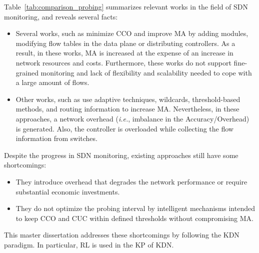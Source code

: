 Table~\ref{tab:comparison_probing} summarizes relevant works in the field of SDN monitoring, and reveals several facts:
\begin{itemize}
    \item Several works, such as \cite{su_2014:flowcover, Sun_2015:HONE,phan2017:sdn_mon,liao_2018:LLDP-looping,jose_2011:online_measurement,tangari_2017:decentralized_monitoring,Tangari_2018:adaptive_decentralized_monitoring,phan2017:adaptive_sdn_mon,tahaei_2018:cost_effective} minimize CCO and improve MA by adding modules, modifying flow tables in the data plane or distributing controllers. As a result, in these works, MA is increased at the expense of an increase in network resources and costs. Furthermore, these works do not support fine-grained monitoring and lack of flexibility and scalability needed to cope with a large amount of flows.
    
    \item Other works, such as \cite{chowdhury_2014:payless,raumer_2014:monsamp,van_2014:OpenNetMon, tahaei_2017:multi-objective,Tootoonchian_2010:opentm} use adaptive techniques, wildcards, threshold-based methods, and routing information to increase MA. Nevertheless, in these approaches, a network overhead (\textit{i.e.}, imbalance in the Accuracy/Overhead) is generated. Also, the controller is overloaded while collecting the flow information from switches.

\end{itemize}{}

Despite the progress in SDN monitoring, existing approaches still have some shortcomings:
\begin{itemize}
    \item They introduce overhead that degrades the network performance or require substantial economic investments.
    
    \item They do not optimize the probing interval by intelligent mechanisms intended to keep CCO and CUC within defined thresholds without compromising MA.
\end{itemize}{}

This master dissertation addresses these shortcomings by following the KDN paradigm. In particular, RL is used in the KP of KDN.\\

